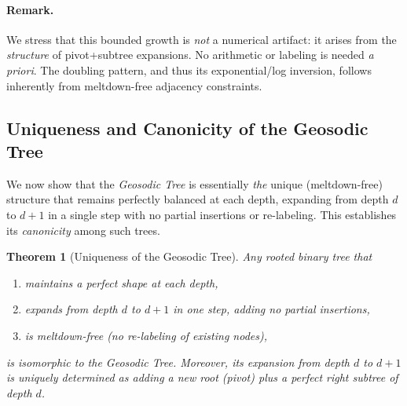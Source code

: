 \documentclass[11pt]{article}
\newtheorem{theorem}{Theorem}
\theoremstyle{definition}
\theoremstyle{remark}
\begin{document}
\paragraph{Remark.}
We stress that this bounded growth is \emph{not} a numerical artifact:
it arises from the \emph{structure} of pivot+subtree expansions.
No arithmetic or labeling is needed \emph{a priori}. The doubling
pattern, and thus its exponential/log inversion, follows inherently
from meltdown-free adjacency constraints.
 \subsection{Uniqueness and Canonicity of the Geosodic Tree}
\label{subsec:uniqueness}

We now show that the \emph{Geosodic Tree} is essentially \emph{the} unique
(meltdown-free) structure that remains perfectly balanced at each depth,
expanding from depth $d$ to $d+1$ in a single step with no partial
insertions or re-labeling. This establishes its \emph{canonicity} among such
trees.

\begin{theorem}[Uniqueness of the Geosodic Tree]
\label{thm:geosodic-uniqueness}
Any rooted binary tree that
\begin{enumerate}
  \item maintains a \emph{perfect} shape at each depth,
  \item expands from depth $d$ to $d+1$ in one step, adding no partial insertions,
  \item is \emph{meltdown-free} (no re-labeling of existing nodes),
\end{enumerate}
is isomorphic to the Geosodic Tree. Moreover, its expansion from depth $d$ to
$d+1$ is uniquely determined as adding a new root (pivot) plus a perfect right
subtree of depth $d$.
\end{theorem}
\end{document}
